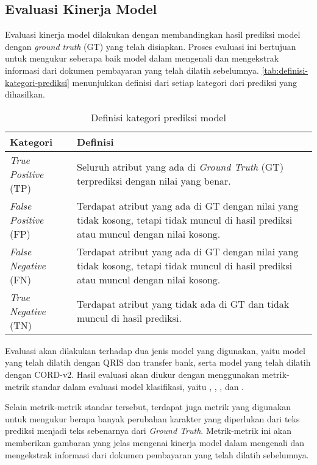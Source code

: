 \subsection{Evaluasi Kinerja Model}
\label{subsec:evaluasi-kinerja-model}

Evaluasi kinerja model dilakukan dengan membandingkan hasil prediksi model dengan \emph{ground truth} (GT) yang telah disiapkan. Proses evaluasi ini bertujuan untuk mengukur seberapa baik model dalam mengenali dan mengekstrak informasi dari dokumen pembayaran yang telah dilatih sebelumnya. \autoref{tab:definisi-kategori-prediksi} menunjukkan definisi dari setiap kategori dari prediksi yang dihasilkan.

\begin{table}[h!]
    \centering
    \caption{Definisi kategori prediksi model}
    \label{tab:definisi-kategori-prediksi}
    \begin{tabularx}{\textwidth}{|p{2.5cm}|X|}
        \hline
        \textbf{Kategori} & \textbf{Definisi} \\ \hline
        \emph{True Positive} (TP) & Seluruh atribut yang ada di \emph{Ground Truth} (GT) terprediksi dengan nilai yang benar. \\ \hline
        \emph{False Positive} (FP) & Terdapat atribut yang ada di GT dengan nilai yang tidak kosong, tetapi tidak muncul di hasil prediksi atau muncul dengan nilai kosong. \\ \hline
        \emph{False Negative} (FN) & Terdapat atribut yang ada di GT dengan nilai yang tidak kosong, tetapi tidak muncul di hasil prediksi atau muncul dengan nilai kosong. \\ \hline
        \emph{True Negative} (TN) & Terdapat atribut yang tidak ada di GT dan tidak muncul di hasil prediksi. \\ \hline
    \end{tabularx}
\end{table}

Evaluasi akan dilakukan terhadap dua jenis model yang digunakan, yaitu model \donut{} yang telah dilatih dengan \dataset{} QRIS dan transfer bank, serta model \donut{} yang telah dilatih dengan \dataset{} CORD-v2. Hasil evaluasi akan diukur dengan menggunakan metrik-metrik standar dalam evaluasi model klasifikasi, yaitu \accuracy, \precision, \recall, dan \fscore. 

Selain metrik-metrik standar tersebut, terdapat juga metrik \mcer{} yang digunakan untuk mengukur berapa banyak perubahan karakter yang diperlukan dari teks prediksi menjadi teks sebenarnya dari \emph{Ground Truth}. Metrik-metrik ini akan memberikan gambaran yang jelas mengenai kinerja model dalam mengenali dan mengekstrak informasi dari dokumen pembayaran yang telah dilatih sebelumnya.
